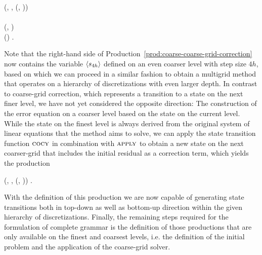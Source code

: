 \begin{bnf}
	 {
		(\bnfts{$\omega$}, \bnfsp {}, \bnfsp {}(, \bnfsp {})) \bnfor
	} \\
	 \\
	 {
		(, \bnfsp {})
	} \\
	 {
		() \bnfsp {} \bnfsp {}.
	}\label{prod:coarse-coarse-grid-correction}
\end{bnf}
Note that the right-hand side of Production~\eqref{prod:coarse-coarse-grid-correction} now contains the variable $\langle s_{4h} \rangle$ defined on an even coarser level with step size $4h$, based on which we can proceed in a similar fashion to obtain a multigrid method that operates on a hierarchy of discretizations with even larger depth.
In contrast to coarse-grid correction, which represents a transition to a state on the next finer level, we have not yet considered the opposite direction: The construction of the error equation on a coarser level based on the state on the current level.
While the state on the finest level is always derived from the original system of linear equations that the method aims to solve, we can apply the state transition function $\textsc{cocy}$ in combination with $\textsc{apply}$ to obtain a new state on the next coarser-grid that includes the initial residual as a correction term, which yields the production
\begin{bnf}
 {
	(, \bnfsp {}, \bnfsp {}(, \bnfsp {}))
}.
\end{bnf}
With the definition of this production we are now capable of generating state transitions both in top-down as well as bottom-up direction within the given hierarchy of discretizations.
Finally, the remaining steps required for the formulation of complete grammar is the definition of those productions that are only available on the finest and coarsest levels, i.e. the definition of the initial problem and the application of the coarse-grid solver.

